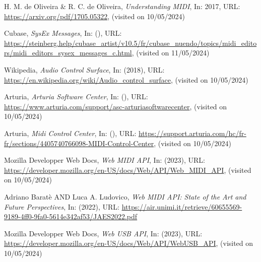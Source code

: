 \documentclass[francais]{rapportPFE}  %
\begin{document}





\begin{thebibliography}{9}

      H. M. de Oliveira \& R. C. de Oliveira,
      \textit{Understanding MIDI},
      In: 2017,
      URL: \url{https://arxiv.org/pdf/1705.05322},
      (visited on 10/05/2024)

        Cubase,
        \textit{SysEx Messages},
        In: (),
        URL: \url{https://steinberg.help/cubase_artist/v10.5/fr/cubase_nuendo/topics/midi_editors/midi_editors_sysex_messages_c.html},
        (visited on 11/05/2024)
    
        Wikipedia,
        \textit{Audio Control Surface},
        In: (2018),
        URL: \url{https://en.wikipedia.org/wiki/Audio_control_surface},
        (visited on 10/05/2024)

        Arturia,
        \textit{Arturia Software Center},
        In: (),
        URL: \url{https://www.arturia.com/support/asc-arturiasoftwarecenter},
        (visited on 10/05/2024)

        Arturia,
        \textit{Midi Control Center},
        In: (),
        URL: \url{https://support.arturia.com/hc/fr-fr/sections/4405740766098-MIDI-Control-Center},
        (visited on 10/05/2024)

        Mozilla Developper Web Docs,
        \textit{Web MIDI API},
        In: (2023),
        URL: \url{https://developer.mozilla.org/en-US/docs/Web/API/Web_MIDI_API},
        (visited on 10/05/2024)

    Adriano Baratè AND Luca A. Ludovico,
        \textit{Web MIDI API: State of the Art and Future
        Perspectives},
        In: (2022),
        URL: \url{https://air.unimi.it/retrieve/60655569-9189-4ff0-9fa0-5614e342af53/JAES2022.pdf}

    

    Mozilla Developper Web Docs,
    \textit{Web USB API},
    In: (2023),
        URL: \url{https://developer.mozilla.org/en-US/docs/Web/API/WebUSB_API},
        (visited on 10/05/2024)
    

\end{thebibliography}
\end{document}
